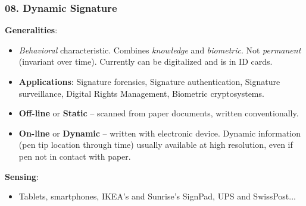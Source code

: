 \documentclass[a4paper]{article}
\begin{document}
    \subsubsection*{08. Dynamic Signature}
      \textbf{Generalities}:
      \begin{itemize}
        \item \emph{Behavioral} characteristic. Combines \emph{knowledge} and \emph{biometric}. Not \emph{permanent} (invariant over time). Currently can be digitalized and is in ID cards.
        \item \textbf{Applications}: Signature forensics, Signature authentication, Signature surveillance, Digital Rights Management, Biometric cryptosystems.
        \item \textbf{Off-line} or \textbf{Static} -- scanned from paper documents, written conventionally.
        \item \textbf{On-line} or \textbf{Dynamic} -- written with electronic device. Dynamic information (pen tip location through time) usually available at high resolution, even if pen not in contact with paper.
      \end{itemize}

      \textbf{Sensing}:
      \begin{itemize}
        \item Tablets, smartphones, IKEA's and Sunrise's SignPad, UPS and SwissPost...
      \end{itemize}
\end{document}
